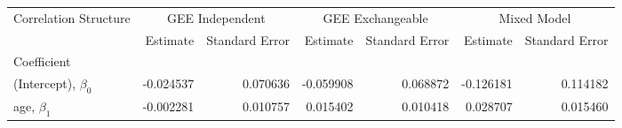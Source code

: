 \begin{tabular}{lrrrrrr}
\toprule
Correlation Structure & \multicolumn{2}{c}{GEE Independent} & \multicolumn{2}{c}{GEE Exchangeable} & \multicolumn{2}{c}{Mixed Model} \\
{} &        Estimate & Standard Error &         Estimate & Standard Error &    Estimate & Standard Error \\
Coefficient            &                 &                &                  &                &             &                \\
\midrule
(Intercept), $\beta_0$ &       -0.024537 &       0.070636 &        -0.059908 &       0.068872 &   -0.126181 &       0.114182 \\
age, $\beta_1$         &       -0.002281 &       0.010757 &         0.015402 &       0.010418 &    0.028707 &       0.015460 \\
\bottomrule
\end{tabular}
